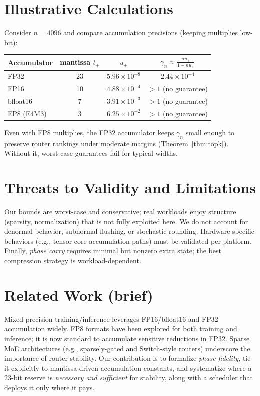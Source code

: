 \documentclass[11pt]{article}
\theoremstyle{plain}
\theoremstyle{definition}
\begin{document}
\section{Illustrative Calculations}
\label{sec:calc}

Consider $n=4096$ and compare accumulation precisions (keeping multiplies low-bit):
\begin{center}
\begin{tabular}{lccc}
\toprule
Accumulator & mantissa $t_+$ & $u_+$ & $\gamma_n \approx \frac{nu_+}{1-nu_+}$ \\
\midrule
FP32 & 23 & $5.96\!\times\!10^{-8}$ & $2.44\!\times\!10^{-4}$ \\
FP16 & 10 & $4.88\!\times\!10^{-4}$ & $>1$ (no guarantee) \\
bfloat16 & 7 & $3.91\!\times\!10^{-3}$ & $>1$ (no guarantee) \\
FP8 (E4M3) & 3 & $6.25\!\times\!10^{-2}$ & $>1$ (no guarantee) \\
\bottomrule
\end{tabular}
\end{center}

Even with FP8 multiplies, the FP32 accumulator keeps $\gamma_n$ small enough to preserve router rankings under moderate margins (Theorem~\ref{thm:topk}). Without it, worst-case guarantees fail for typical widths.

\section{Threats to Validity and Limitations}
Our bounds are worst-case and conservative; real workloads enjoy structure (sparsity, normalization) that is not fully exploited here. We do not account for denormal behavior, subnormal flushing, or stochastic rounding. Hardware-specific behaviors (e.g., tensor core accumulation paths) must be validated per platform. Finally, \emph{phase carry} requires minimal but nonzero extra state; the best compression strategy is workload-dependent.

\section{Related Work (brief)}
Mixed-precision training/inference leverages FP16/bfloat16 and FP32 accumulation widely. FP8 formats have been explored for both training and inference; it is now standard to accumulate sensitive reductions in FP32. Sparse MoE architectures (e.g., sparsely-gated and Switch-style routers) underscore the importance of router stability. Our contribution is to formalize \emph{phase fidelity}, tie it explicitly to mantissa-driven accumulation constants, and systematize where a $23$-bit reserve is \emph{necessary and sufficient} for stability, along with a scheduler that deploys it only where it pays.
\end{document}

